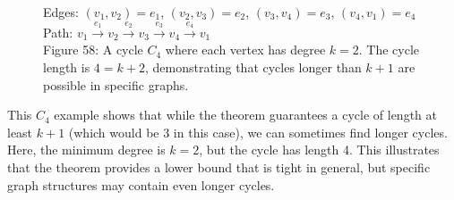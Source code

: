 \documentclass{article}
\theoremstyle{definition}
\begin{document}
\begin{figure}[h]
\centering
{}

\begin{center}
\small Edges: $(v_1,v_2) = e_1$, $(v_2,v_3) = e_2$, $(v_3,v_4) = e_3$, $(v_4,v_1) = e_4$\\
Path: $v_1 \xrightarrow{e_1} v_2 \xrightarrow{e_2} v_3 \xrightarrow{e_3} v_4 \xrightarrow{e_4} v_1$\\
\vspace{0.2cm}
Figure 58: A cycle $C_4$ where each vertex has degree $k=2$. The cycle length is $4 = k+2$, 
demonstrating that cycles longer than $k+1$ are possible in specific graphs.
\end{center}
\label{fig:58}
\end{figure}

This $C_4$ example shows that while the theorem guarantees a cycle of length at least $k+1$ (which would be 3 in this case), we can sometimes find longer cycles. Here, the minimum degree is $k=2$, but the cycle has length 4. This illustrates that the theorem provides a lower bound that is tight in general, but specific graph structures may contain even longer cycles.
\end{document}
